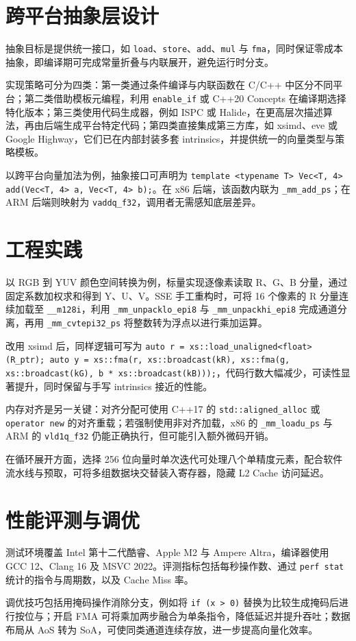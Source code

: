 \chapter{跨平台抽象层设计}
抽象目标是提供统一接口，如 \texttt{load}、\texttt{store}、\texttt{add}、\texttt{mul} 与 \texttt{fma}，同时保证零成本抽象，即编译期可完成常量折叠与内联展开，避免运行时分支。\par
实现策略可分为四类：第一类通过条件编译与内联函数在 C/C++ 中区分不同平台；第二类借助模板元编程，利用 \texttt{enable\_{}if} 或 C++20 Concepts 在编译期选择特化版本；第三类使用代码生成器，例如 ISPC 或 Halide，在更高层次描述算法，再由后端生成平台特定代码；第四类直接集成第三方库，如 xsimd、eve 或 Google Highway，它们已在内部封装多套 intrinsics，并提供统一的向量类型与策略模板。\par
以跨平台向量加法为例，抽象接口可声明为 \texttt{template <typename T> Vec<T, 4> add(Vec<T, 4> a, Vec<T, 4> b);}。在 x86 后端，该函数内联为 \texttt{\_{}mm\_{}add\_{}ps}；在 ARM 后端则映射为 \texttt{vaddq\_{}f32}，调用者无需感知底层差异。\par
\chapter{工程实践}
以 RGB 到 YUV 颜色空间转换为例，标量实现逐像素读取 R、G、B 分量，通过固定系数加权求和得到 Y、U、V。SSE 手工重构时，可将 16 个像素的 R 分量连续加载至 \texttt{\_{}\_{}m128i}，利用 \texttt{\_{}mm\_{}unpacklo\_{}epi8} 与 \texttt{\_{}mm\_{}unpackhi\_{}epi8} 完成通道分离，再用 \texttt{\_{}mm\_{}cvtepi32\_{}ps} 将整数转为浮点以进行乘加运算。\par
改用 xsimd 后，同样逻辑可写为 \texttt{auto r = xs::load\_{}unaligned<float>(R\_{}ptr); auto y = xs::fma(r, xs::broadcast(kR), xs::fma(g, xs::broadcast(kG), b * xs::broadcast(kB)));}，代码行数大幅减少，可读性显著提升，同时保留与手写 intrinsics 接近的性能。\par
内存对齐是另一关键：对齐分配可使用 C++17 的 \texttt{std::aligned\_{}alloc} 或 \texttt{operator new} 的对齐重载；若强制使用非对齐加载，x86 的 \texttt{\_{}mm\_{}loadu\_{}ps} 与 ARM 的 \texttt{vld1q\_{}f32} 仍能正确执行，但可能引入额外微码开销。\par
在循环展开方面，选择 256 位向量时单次迭代可处理八个单精度元素，配合软件流水线与预取，可将多组数据块交替装入寄存器，隐藏 L2 Cache 访问延迟。\par
\chapter{性能评测与调优}
测试环境覆盖 Intel 第十二代酷睿、Apple M2 与 Ampere Altra，编译器使用 GCC 12、Clang 16 及 MSVC 2022。评测指标包括每秒操作数、通过 \texttt{perf stat} 统计的指令与周期数，以及 Cache Miss 率。\par
调优技巧包括用掩码操作消除分支，例如将 \texttt{if (x > 0)} 替换为比较生成掩码后进行按位与；开启 FMA 可将乘加两步融合为单条指令，降低延迟并提升吞吐；数据布局从 AoS 转为 SoA，可使同类通道连续存放，进一步提高向量化效率。\par
